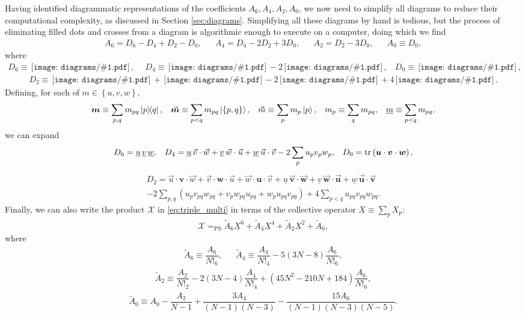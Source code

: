 \documentclass[nofootinbib,notitlepage,11pt]{revtex4-2}
\newcommand{\f}[2]{\dfrac{#1}{#2}} %
\newcommand{\p}[1]{\left(#1\right)} %
\renewcommand{\set}[1]{\left\{#1\right\}} %
\renewcommand{\c}{\cdot} %
\newcommand{\m}{\bm} %
\renewcommand{\v}{\vec} %
\newcommand{\1}{\mathds{1}}
\newcommand{\X}{\mathcal{X}}
\newcommand{\EQPS}{=_{\text{PS}}}
\newcommand{\col}{\underline}
\newcommand{\diagram}[1]
{\,\texttt{[image: diagrams/\#1.pdf]}\,}
\begin{document}
Having identified diagrammatic representations of the coefficients
$A_6,A_4,A_2,A_0$, we now need to simplify all diagrams to reduce
their computational complexity, as discussed in Section
\ref{sec:diagrams}.  Simplifying all these diagrams by hand is
tedious, but the process of eliminating filled dots and crosses from a
diagram is algorithmic enough to execute on a computer, doing which we
find
\begin{align}
  A_6 = D_6 - D_4 + D_2 - D_0,
  &&
  A_4 = D_4 - 2 D_2 + 3 D_0,
  &&
  A_2 = D_2 - 3 D_0,
  &&
  A_0 \equiv D_0,
\end{align}
where
\begin{align}
  D_6 \equiv \diagram{triple_0_o},
  &&
  D_4 \equiv \diagram{triple_01_o} - 2 \diagram{triple_1_o},
  &&
  D_0 \equiv \diagram{triple_0111_o},
\end{align}
\begin{align}
  D_2 \equiv \diagram{triple_011_o}
  + \diagram{triple_02_o}
  - 2 \diagram{triple_11_o}
  + 4 \diagram{triple_2_o}.
\end{align}
Defining, for each of $m\in\set{u,v,w}$,
\begin{align}
  \m m \equiv \sum_{p,q} m_{pq} \op{p}{q},
  &&
  \v{\m m} \equiv \sum_{p<q} m_{pq} \ket{\set{p,q}},
  &&
  \v m \equiv \sum_p m_p \ket{p},
  &&
  m_p \equiv \sum_q m_{pq},
  &&
  \col{m} \equiv \sum_{p<q} m_{pq},
\end{align}
we can expand
\begin{align}
  D_6 = \col{u}\,\col{v}\,\col{w},
  &&
  D_4 = \col{u}\,\v v\c\v w + \col{v}\,\v w\c\v u
  + \col{w}\,\v u\c\v v - 2 \sum_p u_p v_p w_p,
  &&
  D_0 = \tr\p{\m u \c \m v \c \m w},
\end{align}
\begin{multline}
  D_2 = \v u \c\m v\c\v w + \v v \c\m w\c\v u + \v w \c\m u\c\v v
  + \col{u}\,\v{\m v}\c\v{\m w} + \col{v}\,\v{\m w}\c\v{\m u}
  + \col{w}\,\v{\m u}\c\v{\m v} \\
  - 2 \sum_{p,q} \p{u_p v_{pq} w_{pq}
    + v_p w_{pq} u_{pq} + w_p u_{pq} v_{pq}}
  + 4 \sum_{p<q} u_{pq} v_{pq} w_{pq}.
\end{multline}
Finally, we can also write the product $\X$ in \eqref{eq:triple_multi}
in terms of the collective operator $\col{X} \equiv \sum_p X_p$:
\begin{align}
  \X \EQPS
  \tilde A_6 \col{X}^6 + \tilde A_4 \col{X}^4
  + \tilde A_2 \col{X}^2 + \tilde A_0,
  \label{eq:triple_col}
\end{align}
where
\begin{align}
  \tilde A_6 \equiv \f{A_6}{N!_6},
  &&
  \tilde A_4 \equiv \f{A_4}{N!_4} - 5\p{3N-8} \f{A_6}{N!_6},
\end{align}
\begin{align}
  \tilde A_2 \equiv \f{A_2}{N!_2} - 2\p{3N-4} \f{A_4}{N!_4}
  + \p{45N^2-210N+184} \f{A_6}{N!_6},
\end{align}
\begin{align}
  \tilde A_0 \equiv A_0 - \f{A_2}{N-1}
  + \f{3A_4}{\p{N-1}\p{N-3}}
  - \f{15A_6}{\p{N-1}\p{N-3}\p{N-5}}.
\end{align}
\end{document}
